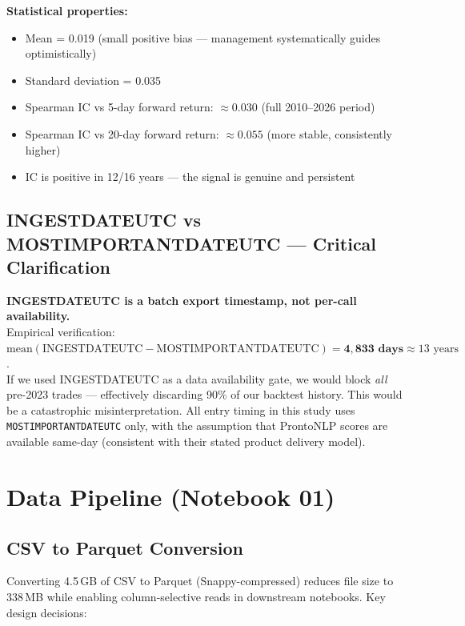 \documentclass[11pt,a4paper]{article}
\begin{document}
\textbf{Statistical properties:}
\begin{itemize}[nosep]
  \item Mean = 0.019 (small positive bias --- management systematically guides optimistically)
  \item Standard deviation = 0.035
  \item Spearman IC vs 5-day forward return: $\approx 0.030$ (full 2010--2026 period)
  \item Spearman IC vs 20-day forward return: $\approx 0.055$ (more stable, consistently higher)
  \item IC is positive in 12/16 years --- the signal is genuine and persistent
\end{itemize}

\subsection{INGESTDATEUTC vs MOSTIMPORTANTDATEUTC --- Critical Clarification}

\begin{callout}
\textbf{INGESTDATEUTC is a batch export timestamp, not per-call availability.}\\[4pt]
Empirical verification: $\text{mean}(\text{INGESTDATEUTC} - \text{MOSTIMPORTANTDATEUTC}) = \mathbf{4{,}833 \text{ days}} \approx 13 \text{ years}$.\\[4pt]
If we used INGESTDATEUTC as a data availability gate, we would block \emph{all} pre-2023 trades --- effectively discarding 90\% of our backtest history. This would be a catastrophic misinterpretation. All entry timing in this study uses \texttt{MOSTIMPORTANTDATEUTC} only, with the assumption that ProntoNLP scores are available same-day (consistent with their stated product delivery model).
\end{callout}

\section{Data Pipeline (Notebook 01)}

\subsection{CSV to Parquet Conversion}

Converting 4.5\,GB of CSV to Parquet (Snappy-compressed) reduces file size to 338\,MB while enabling column-selective reads in downstream notebooks. Key design decisions:
\end{document}
